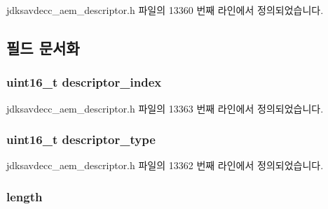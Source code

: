 jdksavdecc\+\_\+aem\+\_\+descriptor.\+h 파일의 13360 번째 라인에서 정의되었습니다.



\subsection{필드 문서화}
\subsubsection[{\texorpdfstring{descriptor\+\_\+index}{descriptor_index}}]{\setlength{\rightskip}{0pt plus 5cm}uint16\+\_\+t descriptor\+\_\+index}\hypertarget{structjdksavdecc__descriptor__memory__object_a042bbc76d835b82d27c1932431ee38d4}{}\label{structjdksavdecc__descriptor__memory__object_a042bbc76d835b82d27c1932431ee38d4}


jdksavdecc\+\_\+aem\+\_\+descriptor.\+h 파일의 13363 번째 라인에서 정의되었습니다.

\subsubsection[{\texorpdfstring{descriptor\+\_\+type}{descriptor_type}}]{\setlength{\rightskip}{0pt plus 5cm}uint16\+\_\+t descriptor\+\_\+type}\hypertarget{structjdksavdecc__descriptor__memory__object_ab7c32b6c7131c13d4ea3b7ee2f09b78d}{}\label{structjdksavdecc__descriptor__memory__object_ab7c32b6c7131c13d4ea3b7ee2f09b78d}


jdksavdecc\+\_\+aem\+\_\+descriptor.\+h 파일의 13362 번째 라인에서 정의되었습니다.

\subsubsection[{\texorpdfstring{length}{length}}]{ length}\hypertarget{structjdksavdecc__descriptor__memory__object_a190b76b1f3d5bd26920300e5f073739b}{}\label{structjdksavdecc__descriptor__memory__object_a190b76b1f3d5bd26920300e5f073739b}


